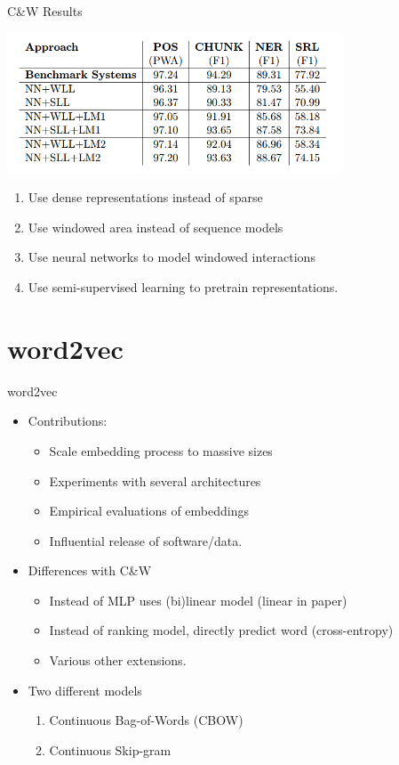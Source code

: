 \documentclass{beamer}
\begin{document}
\begin{frame}{C\&W Results}
  \begin{center}
    \includegraphics[width=10cm]{cwresults}
  \end{center}
  \begin{enumerate}
  \item Use dense representations instead of sparse
  \item Use windowed area instead of sequence models
  \item Use neural networks to model windowed interactions
  \item Use semi-supervised learning to pretrain representations.
  \end{enumerate}
\end{frame}

\section{word2vec}

\begin{frame}{word2vec}
  \begin{itemize}
  \item Contributions:
    \begin{itemize}
    \item Scale embedding process to massive sizes
    \item Experiments with several architectures
    \item Empirical evaluations of embeddings
    \item Influential release of software/data.
    \end{itemize}
    \pause

  \item Differences with C\&W
    \begin{itemize}
    \item Instead of MLP uses (bi)linear model (linear in paper)
    \item Instead of ranking model, directly predict word (cross-entropy)
    \item Various other extensions.
    \end{itemize}

  \item Two different models
    \begin{enumerate}
    \item Continuous Bag-of-Words (CBOW)
    \item Continuous Skip-gram
    \end{enumerate}



  \end{itemize}
\end{frame}
\end{document}
